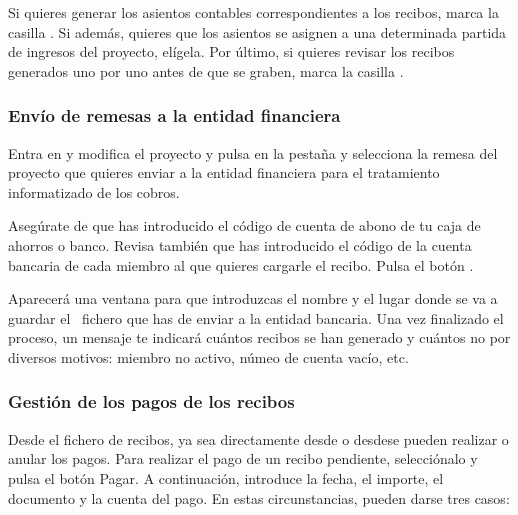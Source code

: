Si quieres generar los asientos contables correspondientes a los
recibos, marca la casilla . Si además,
quieres que los asientos se asignen a una determinada partida de
ingresos del proyecto, elígela. Por último, si quieres revisar los
recibos generados uno por uno antes de que se graben, marca la casilla
. 

\subsubsection{Envío de remesas a la entidad financiera}
Entra en \textstyleGUIELEMENT{$\rightarrow $}y modifica el proyecto y pulsa en la pestaña
 y selecciona la
remesa del proyecto que quieres enviar a la entidad financiera para el
tratamiento informatizado de los cobros.

Asegúrate de que has introducido el código de cuenta de abono de tu
caja de ahorros o banco. Revisa también que has introducido el
código de la cuenta bancaria de cada miembro al que quieres cargarle
el recibo. Pulsa el botón . 

Aparecerá una ventana para que introduzcas el nombre y el lugar donde
se va a guardar el \ fichero que has de enviar a la entidad bancaria.
Una vez finalizado el proceso, un mensaje te indicará cuántos
recibos se han generado y cuántos no por diversos motivos: miembro no
activo, númeo de cuenta vacío, etc.

\subsubsection{Gestión de los pagos de los recibos}
Desde el fichero de recibos, ya sea directamente desde
\textstyleGUIELEMENT{$\rightarrow
$}o desde\textstyleGUIELEMENT{$\rightarrow $}\textstyleGUIELEMENT{$\rightarrow $}\textstyleGUIELEMENT{$\rightarrow $}se pueden realizar o anular los pagos. Para realizar el pago
de un recibo pendiente, selecciónalo y pulsa el botón Pagar. A
continuación, introduce la fecha, el importe, el documento y la
cuenta del pago. En estas circunstancias, pueden darse tres casos:

